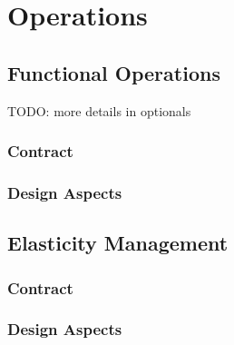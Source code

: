 \chapter{Operations}\label{ch:operations}

\section{Functional Operations}\label{sec:functional_operations}
TODO: more details in optionals
\subsection{Contract}\label{subsec:functional-operations-contract}

\subsection{Design Aspects}\label{subsec:functional-operations-design-aspects}

\section{Elasticity Management}\label{sec:elasticity_management}

\subsection{Contract}\label{subsec:elasticity-management-contract}

\subsection{Design Aspects}\label{subsec:elasticity-management-design-aspects}
